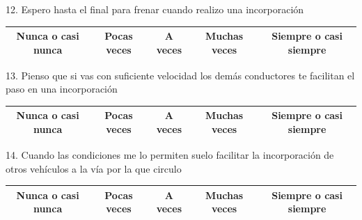12. Espero hasta el final para frenar cuando realizo una incorporación
\vspace{-10pt}
\begin{table}[h]
\centering
\begin{tabular}{|c|c|c|c|c|}
\hline
Nunca o casi nunca & Pocas veces & A veces & Muchas veces & Siempre o casi siempre \\ \hline
\end{tabular}
\end{table}

13. Pienso que si vas con suficiente velocidad los demás conductores te facilitan el paso en una incorporación
\vspace{-10pt}
\begin{table}[h]
\centering
\begin{tabular}{|c|c|c|c|c|}
\hline
Nunca o casi nunca & Pocas veces & A veces & Muchas veces & Siempre o casi siempre \\ \hline
\end{tabular}
\end{table}

14. Cuando las condiciones me lo permiten suelo facilitar la incorporación de otros vehículos a la vía por la que circulo
\vspace{-10pt}
\begin{table}[h]
\centering
\begin{tabular}{|c|c|c|c|c|}
\hline
Nunca o casi nunca & Pocas veces & A veces & Muchas veces & Siempre o casi siempre \\ \hline
\end{tabular}
\end{table}

